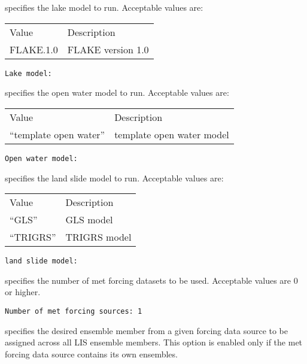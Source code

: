  
 
  specifies the lake model to run.
 Acceptable values are:

 \begin{tabular}{ll}
 Value     & Description       \\
 FLAKE.1.0 & FLAKE version 1.0 \\
 \end{tabular}
 

 \begin{Verbatim}[frame=single]
Lake model:
 \end{Verbatim}
 

 
 
  specifies the open water model to run.
 Acceptable values are:

 \begin{tabular}{ll}
 Value                   & Description               \\
 ``template open water'' & template open water model \\
 \end{tabular}
 

 \begin{Verbatim}[frame=single]
Open water model:
 \end{Verbatim}
 

 
 
  specifies the land slide model to run.
 Acceptable values are:

 \begin{tabular}{ll}
 Value      & Description  \\
 ``GLS''    & GLS model    \\
 ``TRIGRS'' & TRIGRS model \\
 \end{tabular}
 

 \begin{Verbatim}[frame=single]
land slide model:
 \end{Verbatim}
 

 
  specifies the
 number of met forcing datasets to be used. Acceptable 
 values are 0 or higher. 
 

 \begin{Verbatim}[frame=single]
Number of met forcing sources: 1
 \end{Verbatim}

 
  specifies the desired
 ensemble member from a given forcing data source to be assigned
 across all LIS ensemble members.  This option is enabled only if
 the met forcing data source contains its own ensembles.
 

